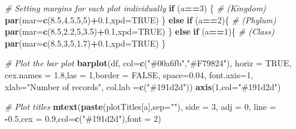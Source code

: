 \documentclass[
  12pt,
]{article}
\newenvironment{Shaded}{\begin{snugshade}}{\end{snugshade}}
\newcommand{\AttributeTok}[1]{\textcolor[rgb]{0.13,0.29,0.53}{#1}}
\newcommand{\CommentTok}[1]{\textcolor[rgb]{0.56,0.35,0.01}{\textit{#1}}}
\newcommand{\ConstantTok}[1]{\textcolor[rgb]{0.56,0.35,0.01}{#1}}
\newcommand{\ControlFlowTok}[1]{\textcolor[rgb]{0.13,0.29,0.53}{\textbf{#1}}}
\newcommand{\DecValTok}[1]{\textcolor[rgb]{0.00,0.00,0.81}{#1}}
\newcommand{\FloatTok}[1]{\textcolor[rgb]{0.00,0.00,0.81}{#1}}
\newcommand{\FunctionTok}[1]{\textcolor[rgb]{0.13,0.29,0.53}{\textbf{#1}}}
\newcommand{\NormalTok}[1]{#1}
\newcommand{\SpecialCharTok}[1]{\textcolor[rgb]{0.81,0.36,0.00}{\textbf{#1}}}
\newcommand{\StringTok}[1]{\textcolor[rgb]{0.31,0.60,0.02}{#1}}
\begin{document}
\begin{Shaded}
\begin{Highlighting}[]
  \CommentTok{\# Setting margins for each plot individually}
  \ControlFlowTok{if}\NormalTok{ (a}\SpecialCharTok{==}\DecValTok{3}\NormalTok{) \{ }\CommentTok{\# (Kingdom)}
    \FunctionTok{par}\NormalTok{(}\AttributeTok{mar=}\FunctionTok{c}\NormalTok{(}\FloatTok{8.5}\NormalTok{,}\FloatTok{4.5}\NormalTok{,}\DecValTok{5}\NormalTok{,}\DecValTok{5}\NormalTok{)}\SpecialCharTok{+}\FloatTok{0.1}\NormalTok{,}\AttributeTok{xpd=}\ConstantTok{TRUE}\NormalTok{)}
\NormalTok{  \} }\ControlFlowTok{else} \ControlFlowTok{if}\NormalTok{ (a}\SpecialCharTok{==}\DecValTok{2}\NormalTok{)\{ }\CommentTok{\# (Phylum)}
    \FunctionTok{par}\NormalTok{(}\AttributeTok{mar=}\FunctionTok{c}\NormalTok{(}\FloatTok{8.5}\NormalTok{,}\FloatTok{2.2}\NormalTok{,}\DecValTok{5}\NormalTok{,}\FloatTok{3.5}\NormalTok{)}\SpecialCharTok{+}\FloatTok{0.1}\NormalTok{,}\AttributeTok{xpd=}\ConstantTok{TRUE}\NormalTok{)}
\NormalTok{  \} }\ControlFlowTok{else} \ControlFlowTok{if}\NormalTok{ (a}\SpecialCharTok{==}\DecValTok{1}\NormalTok{)\{ }\CommentTok{\# (Class)}
    \FunctionTok{par}\NormalTok{(}\AttributeTok{mar=}\FunctionTok{c}\NormalTok{(}\FloatTok{8.5}\NormalTok{,}\DecValTok{3}\NormalTok{,}\DecValTok{5}\NormalTok{,}\FloatTok{1.7}\NormalTok{)}\SpecialCharTok{+}\FloatTok{0.1}\NormalTok{,}\AttributeTok{xpd=}\ConstantTok{TRUE}\NormalTok{)}
\NormalTok{  \}}
  
  \CommentTok{\# Plot the bar plot}
  \FunctionTok{barplot}\NormalTok{(df, }
          \AttributeTok{col=}\FunctionTok{c}\NormalTok{(}\StringTok{"\#00a6fb"}\NormalTok{,}\StringTok{"\#F79824"}\NormalTok{), }
          \AttributeTok{horiz =} \ConstantTok{TRUE}\NormalTok{, }\AttributeTok{cex.names =} \FloatTok{1.8}\NormalTok{,}\AttributeTok{las =} \DecValTok{1}\NormalTok{,}\AttributeTok{border =} \ConstantTok{FALSE}\NormalTok{, }
          \AttributeTok{space=}\FloatTok{0.04}\NormalTok{, }
          \AttributeTok{font.axis=}\DecValTok{1}\NormalTok{, }
          \AttributeTok{xlab=}\StringTok{"Number of records"}\NormalTok{,}
          \AttributeTok{col.lab =}\FunctionTok{c}\NormalTok{(}\StringTok{"\#191d2d"}\NormalTok{))}
  \FunctionTok{axis}\NormalTok{(}\DecValTok{1}\NormalTok{,}\AttributeTok{col=}\StringTok{"\#191d2d"}\NormalTok{)}
  
  \CommentTok{\# Plot titles}
  \FunctionTok{mtext}\NormalTok{(}\FunctionTok{paste}\NormalTok{(plotTitles[a],}\AttributeTok{sep=}\StringTok{""}\NormalTok{),}
        \AttributeTok{side =} \DecValTok{3}\NormalTok{, }\AttributeTok{adj =} \DecValTok{0}\NormalTok{, }\AttributeTok{line =} \SpecialCharTok{{-}}\FloatTok{0.5}\NormalTok{,}\AttributeTok{cex =} \FloatTok{0.9}\NormalTok{,}\AttributeTok{col=}\FunctionTok{c}\NormalTok{(}\StringTok{"\#191d2d"}\NormalTok{),}\AttributeTok{font =} \DecValTok{2}\NormalTok{)}
  

\end{Highlighting}
\end{Shaded}
\end{document}
